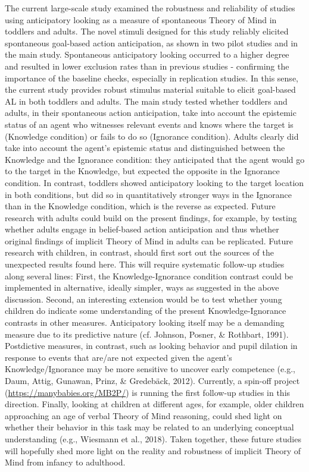 \documentclass[
  man,floatsintext]{apa6}
\begin{document}
The current large-scale study examined the robustness and reliability of studies using anticipatory looking as a measure of spontaneous Theory of Mind in toddlers and adults. The novel stimuli designed for this study reliably elicited spontaneous goal-based action anticipation, as shown in two pilot studies and in the main study. Spontaneous anticipatory looking occurred to a higher degree and resulted in lower exclusion rates than in previous studies - confirming the importance of the baseline checks, especially in replication studies. In this sense, the current study provides robust stimulus material suitable to elicit goal-based AL in both toddlers and adults.
The main study tested whether toddlers and adults, in their spontaneous action anticipation, take into account the epistemic status of an agent who witnesses relevant events and knows where the target is (Knowledge condition) or fails to do so (Ignorance condition). Adults clearly did take into account the agent's epistemic status and distinguished between the Knowledge and the Ignorance condition: they anticipated that the agent would go to the target in the Knowledge, but expected the opposite in the Ignorance condition. In contrast, toddlers showed anticipatory looking to the target location in both conditions, but did so in quantitatively stronger ways in the Ignorance than in the Knowledge condition, which is the reverse as expected.
Future research with adults could build on the present findings, for example, by testing whether adults engage in belief-based action anticipation and thus whether original findings of implicit Theory of Mind in adults can be replicated. Future research with children, in contrast, should first sort out the sources of the unexpected results found here. This will require systematic follow-up studies along several lines: First, the Knowledge-Ignorance condition contrast could be implemented in alternative, ideally simpler, ways as suggested in the above discussion. Second, an interesting extension would be to test whether young children do indicate some understanding of the present Knowledge-Ignorance contrasts in other measures. Anticipatory looking itself may be a demanding measure due to its predictive nature (cf. Johnson, Posner, \& Rothbart, 1991). Postdictive measures, in contrast, such as looking behavior and pupil dilation in response to events that are/are not expected given the agent's Knowledge/Ignorance may be more sensitive to uncover early competence (e.g., Daum, Attig, Gunawan, Prinz, \& Gredebäck, 2012). Currently, a spin-off project (\url{https://manybabies.org/MB2P/}) is running the first follow-up studies in this direction. Finally, looking at children at different ages, for example, older children approaching an age of verbal Theory of Mind reasoning, could shed light on whether their behavior in this task may be related to an underlying conceptual understanding (e.g., Wiesmann et al., 2018). Taken together, these future studies will hopefully shed more light on the reality and robustness of implicit Theory of Mind from infancy to adulthood.
\end{document}
